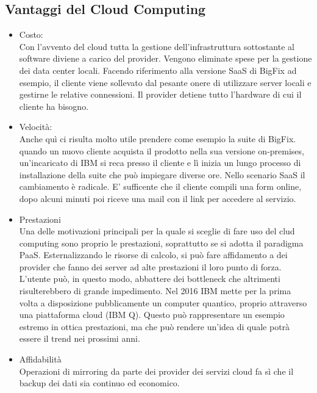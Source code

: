 \subsection{Vantaggi del Cloud Computing}
\begin{itemize}
	\item Costo: \\
	Con l'avvento del cloud tutta la gestione dell'infrastruttura sottostante al software diviene a carico del provider. Vengono eliminate spese per la gestione dei data center locali. Facendo riferimento alla versione SaaS di BigFix ad esempio, il cliente viene sollevato dal pesante onere di utilizzare server locali e gestirne le relative connessioni. Il provider detiene tutto l'hardware di cui il cliente ha bisogno.
	
	\item Velocità: \\
	Anche quì ci risulta molto utile prendere come esempio la suite di BigFix. quando un nuovo cliente acquista il prodotto nella sua versione on-premises, un'incaricato di IBM si reca presso il cliente e lì inizia un lungo processo di installazione della suite che può impiegare diverse ore. Nello scenario SaaS il cambiamento è radicale. E' sufficente che il cliente compili una form online, dopo alcuni minuti poi riceve una mail con il link per accedere al servizio.
	
	\item Prestazioni \\
	Una delle motivazioni principali per la quale si sceglie di fare uso del clud computing sono proprio le prestazioni, soprattutto se si adotta il paradigma PaaS. Esternalizzando le risorse di calcolo, si può fare affidamento a dei provider che fanno dei server ad alte prestazioni il loro punto di forza. L'utente può, in questo modo, abbattere dei bottleneck che altrimenti risulterebbero di grande impedimento. Nel 2016 IBM mette per la prima volta a disposizione pubblicamente un computer quantico, proprio attraverso una piattaforma cloud (IBM Q). Questo può rappresentare un esempio estremo in ottica prestazioni, ma che può rendere un'idea di quale potrà essere il trend nei prossimi anni.
	
	\item Affidabilità \\
	Operazioni di mirroring da parte dei provider dei servizi cloud fa sì che il backup dei dati sia continuo ed economico.
\end{itemize}

